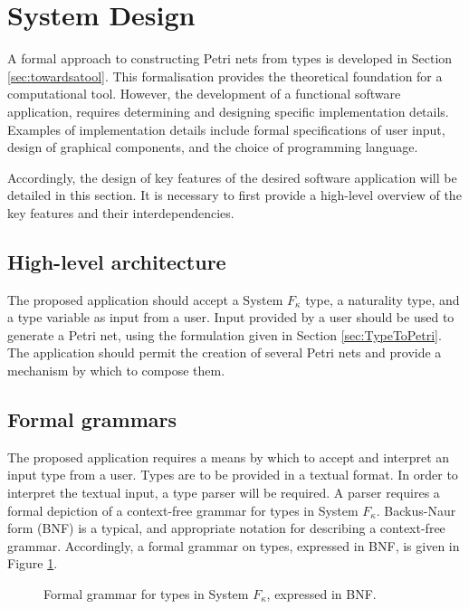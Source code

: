 \documentclass[../Dissertation.tex]{subfiles}
\begin{document}
\section{System Design}
A formal approach to constructing Petri nets from types is developed in Section \ref{sec:towardsatool}. This formalisation provides the theoretical foundation for a computational tool. However, the development of a functional software application, requires determining and designing specific implementation details. Examples of implementation details include formal specifications of user input, design of graphical components, and the choice of programming language. 
\par
Accordingly, the design of key features of the desired software application will  be detailed in this section. It is necessary to first provide a high-level overview of the key features and their interdependencies.

\subsection{High-level architecture}
The proposed application should accept a System $F_\kappa$ type, a naturality type, and a type variable as input from a user. Input provided by a user should be used to generate a Petri net, using the formulation given in Section \ref{sec:TypeToPetri}. The application should permit the creation of several Petri nets and provide a mechanism by which to compose them. 

\subsection{Formal grammars}
The proposed application requires a means by which to accept and interpret an input type from a user. Types are to be provided in a textual format. In order to interpret the textual input, a type parser will be required. A parser requires a formal depiction of a context-free grammar for types in System $F_\kappa$. Backus-Naur form (BNF) is a typical, and appropriate notation for describing a context-free grammar. Accordingly, a formal grammar on types, expressed in BNF, is given in Figure \ref{fig:typegrammar}.

\begin{figure}[H]

\caption{Formal grammar for types in System $F_\kappa$, expressed in BNF.}
\label{fig:typegrammar}
\end{figure}
\end{document}
